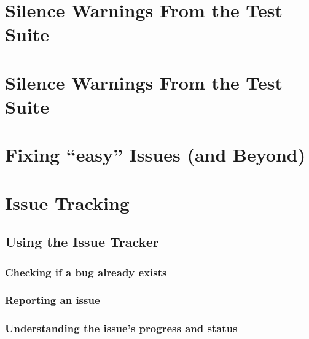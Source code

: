 \documentclass[]{book}
\begin{document}
\hypertarget{silence-warnings-from-the-test-suite}{%
\chapter{Silence Warnings From the Test Suite}\label{silence-warnings-from-the-test-suite}}

\hypertarget{silence-warnings-from-the-test-suite-1}{%
\chapter{Silence Warnings From the Test Suite}\label{silence-warnings-from-the-test-suite-1}}

\hypertarget{fixing-easy-issues-and-beyond}{%
\chapter{Fixing ``easy'' Issues (and Beyond)}\label{fixing-easy-issues-and-beyond}}

\hypertarget{issue-tracking}{%
\chapter{Issue Tracking}\label{issue-tracking}}

\hypertarget{using-the-issue-tracker}{%
\section{Using the Issue Tracker}\label{using-the-issue-tracker}}

\hypertarget{checking-if-a-bug-already-exists}{%
\subsection{Checking if a bug already exists}\label{checking-if-a-bug-already-exists}}

\hypertarget{reporting-an-issue}{%
\subsection{Reporting an issue}\label{reporting-an-issue}}

\hypertarget{understanding-the-issues-progress-and-status}{%
\subsection{Understanding the issue's progress and status}\label{understanding-the-issues-progress-and-status}}
\end{document}
